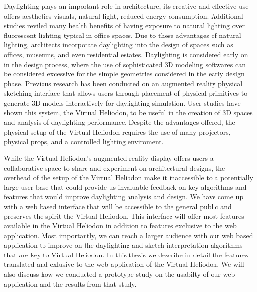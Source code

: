 

Daylighting plays an important role in architecture, its creative and effective use offers aesthetics visuals, natural light, reduced energy consumption. 
Additional studies reviled many health benefits of having exposure to natural lighting over fluorescent lighting typical in office spaces. %
Due to these advantages of natural lighting, architects incorporate daylighting into the design of spaces such as offices, museums, and even residential estates. %
Daylighting is considered early on in the design process, where the use of sophisticated 3D modeling softwares can be considered excessive for the simple geometries considered in the early design phase.
Previous research has been conducted on an augmented reality physical sketching interface that allows users through placement of physical primitives to generate 3D models interactively for daylighting simulation.
User studies have shown this system, the Virtual Heliodon, to be useful in the creation of 3D spaces and analysis of daylighting performance.%
Despite the advantages offered, the physical setup of the Virtual Heliodon requires the use of many projectors, physical props, and a controlled lighting enviroment.

While the Virtual Heliodon's augmented reality display offers users a collaborative space to share and experiment on architectural designs, the overhead of the setup of the Virtual Heliodon make it inaccessible to a potentially large user base that could provide us invaluable feedback on key algorithms and features that would improve daylighting analysis and design. 
We have come up with a web based interface that will be accessible to the general public and preserves the spirit the Virtual Heliodon.
This interface will offer most features available in the Virtual Heliodon in addition to features exclusive to the web application.%
Most importantly, we can reach a larger audience with our web based application to improve on the daylighting and sketch interpretation algorithms that are key to Virtual Heliodon.
In this thesis we describe in detail the features translated and exlusive to the web application of the Virtual Heliodon.
We will also discuss how we conducted a prototype study on the usabilty of our web application and the results from that study.

